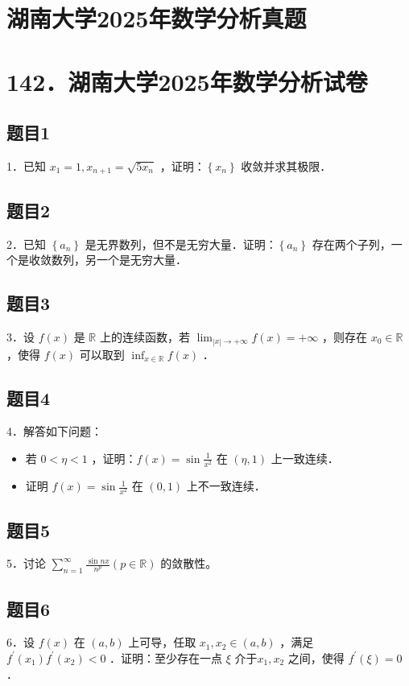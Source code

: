 \documentclass{article}
\begin{document}
\section*{湖南大学2025年数学分析真题}
\section*{142．湖南大学2025年数学分析试卷}

\subsection{题目1}
1．已知 \(x_{1}=1, x_{n+1}=\sqrt{5 x_{n}}\) ，证明：\(\left\{x_{n}\right\}\) 收敛并求其极限．

\subsection{题目2}
2．已知 \(\left\{a_{n}\right\}\) 是无界数列，但不是无穷大量．证明：\(\left\{a_{n}\right\}\) 存在两个子列，一个是收敛数列，另一个是无穷大量．

\subsection{题目3}
3．设 \(f(x)\) 是 \(\mathbb{R}\) 上的连续函数，若 \(\lim _{|x| \rightarrow+\infty} f(x)=+\infty\) ，则存在 \(x_{0} \in \mathbb{R}\) ，使得 \(f(x)\) 可以取到 \(\inf _{x \in \mathbb{R}} f(x)\) ．

\subsection{题目4}
4．解答如下问题：

\begin{itemize}
  \item[（1）] 若 \(0<\eta<1\) ，证明：\(f(x)=\sin \frac{1}{x^{2}}\) 在 \((\eta, 1)\) 上一致连续．
  \item[（2）] 证明 \(f(x)=\sin \frac{1}{x^{2}}\) 在 \((0,1)\) 上不一致连续．
\end{itemize}

\subsection{题目5}
5．讨论 \(\sum_{n=1}^{\infty} \frac{\sin n x}{n^{p}}(p \in \mathbb{R})\) 的敛散性。

\subsection{题目6}
6．设 \(f(x)\) 在 \((a, b)\) 上可导，任取 \(x_{1}, x_{2} \in(a, b)\) ，满足 \(f^{\prime}\left(x_{1}\right) f^{\prime}\left(x_{2}\right)<0\) ．证明：至少存在一点 \(\xi\) 介于\(x_{1}, x_{2}\) 之间，使得 \(f^{\prime}(\xi)=0\) ．
\end{document}

